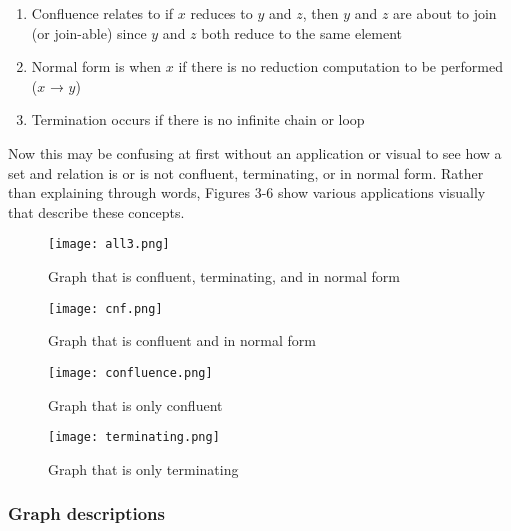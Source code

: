 \documentclass{article}
\begin{document}
\begin{enumerate}
    \item Confluence relates to if $x$ reduces to $y$ and $z$, then $y$ and $z$ are about to join (or join-able) since $y$ and $z$ both reduce to the same element
    \item Normal form is when $x$ if there is no reduction computation to be performed ($x$ → $y$)
    \item Termination occurs if there is no infinite chain or loop
\end{enumerate}

\noindent
Now this may be confusing at first without an application or visual to see how a set and relation is or is not confluent, terminating, or in normal form. Rather than explaining through words, Figures 3-6 show various applications visually that describe these concepts.

\begin{figure}[H]
    \centering
    \texttt{[image: all3.png]}
    \caption{Graph that is confluent, terminating, and in normal form}
    \label{fig:AST1}
\end{figure}

\begin{figure}[H]
    \centering
    \texttt{[image: cnf.png]}
    \caption{Graph that is confluent and in normal form}
    \label{fig:AST2}
\end{figure}

\begin{figure}[H]
    \centering
    \texttt{[image: confluence.png]}
    \caption{Graph that is only confluent}
    \label{fig:AST3}
\end{figure}

\begin{figure}[H]
    \centering
    \texttt{[image: terminating.png]}
    \caption{Graph that is only terminating}
    \label{fig:AST4}
\end{figure}

\subsubsection{Graph descriptions}
\end{document}
